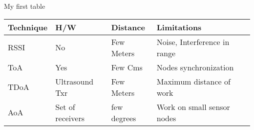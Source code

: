  \caption{My first table} %
  \label{table:t1} %
  \centering %
 \begin{tabular}{l l l l l} %
 \hline\hline %
Technique   &H/W  & Distance  & Limitations \\ [0.5ex] %
 \hline %
RSSI     & No              & Few Meters  & Noise, Interference in range\\
ToA      & Yes             & Few Cms     & Nodes synchronization\\
TDoA     & Ultrasound Txr  & Few Meters  & Maximum distance of work\\
AoA      & Set of receivers & few degrees & Work on small sensor nodes\\[0.5ex] %
 \hline %
 \end{tabular}